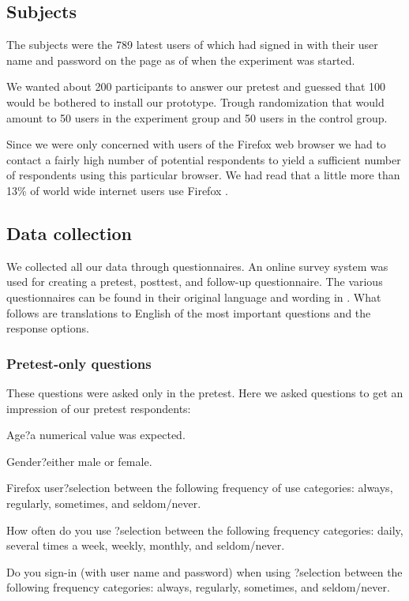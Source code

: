 \subsection{Subjects}

The subjects were the 789 latest users of \urort{} which had
signed in with their user name and password on the \urort{} page as of when
the experiment was started.

We wanted about 200 participants to answer our pretest and guessed that
100 would be bothered to install our prototype. Trough randomization
that would amount to 50 users in the experiment group and 50 users
in the control group.

Since we were only concerned with users of the Firefox web browser we had to
contact a fairly high number of potential respondents to yield a sufficient
number of respondents using this particular browser. We had read that a little
more than 13\% of world wide internet users use Firefox \citep{onestat08}.

\subsection{Data collection}

We collected all our data through questionnaires. An online survey system was
used for creating a pretest, posttest, and follow-up questionnaire.
The various
questionnaires can be found in their original language and wording in
. What follows are translations to English
of the most important questions and the response options.

\subsubsection{Pretest-only questions}

These questions were asked only in the pretest. Here we asked questions to
get an impression of our pretest respondents:

\begin{items}
  \item Age{}?\dash{}a numerical value was expected.
  \item Gender{}?\dash{}either male or female.
  \item Firefox user{}?\dash{}selection between the following frequency of use
    categories: always, regularly, sometimes, and seldom/never.
  \item How often do you use \urort{}?\dash{}selection between the following
    frequency categories: daily, several times a week, weekly, monthly,
    and seldom/never.
  \item Do you sign-in (with user name and password) when using
    \urort{}?\dash{}selection between the following frequency
    categories: always, regularly, sometimes, and seldom/never.
\end{items}

